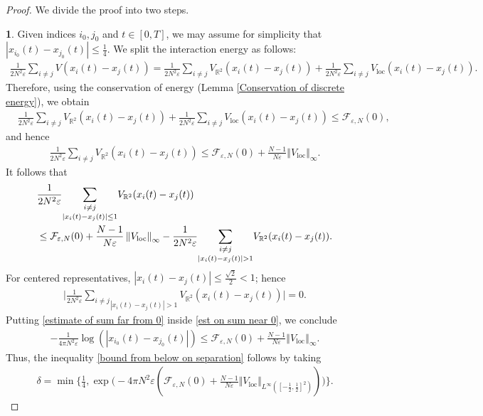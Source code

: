 \documentclass[11pt,reqno]{amsart}
\numberwithin{equation}{section}
\begin{document}
\begin{proof} We divide the proof into two steps.

\smallskip
\textbf{1}. Given indices $i_{0},j_{0}$ and $t\in [0,T]$, 
we may assume for simplicity that $\left\vert x_{i_{0}}(t)-x_{j_{0}}(t)\right\vert \leq \frac{1}{4}$. 
We split the interaction energy as follows:  
\begin{align*}
\frac{1}{2N^{2}\varepsilon}\sum_{i\neq j}V(x_{i}(t)-x_{j}(t))
=\frac{1}{2N^{2}\varepsilon}\sum_{i\neq j}V_{\mathbb{R}^{2}}(x_{i}(t)-x_{j}(t))
+\frac{1}{2N^{2}\varepsilon}\sum_{i\neq j}V_{\mathrm{loc}}(x_{i}(t)-x_{j}(t)).    
\end{align*}
Therefore, using the conservation of energy (Lemma \ref{Conservation of discrete energy}), 
we obtain 
\begin{align*}
&\frac{1}{2N^{2}\varepsilon}\sum_{i\neq j}V_{\mathbb{R}^{2}}(x_{i}(t)-x_{j}(t))+\frac{1}{2N^{2}\varepsilon}\sum_{i\neq j}V_{\mathrm{loc}}(x_{i}(t)-x_{j}(t))
\leq \mathcal{F}_{\varepsilon,N}(0),     
\end{align*}
and hence  
\begin{align*}
\frac{1}{2N^{2}\varepsilon}\sum_{i\neq j} V_{\mathbb{R}^{2}}(x_{i}(t)-x_{j}(t))\leq \mathcal{F}_{\varepsilon,N}(0)+\frac{N-1}{N\varepsilon}\left\Vert V_{\mathrm{loc}}\right\Vert_{\infty}.  
\end{align*}
It follows that 
\begin{align}
&\frac{1}{2N^{2}\varepsilon}\underset{\left\vert x_{i}(t)-x_{j}(t)\right\vert\leq 1}{\sum_{i\neq j}}V_{\mathbb{R}^{2}}(x_{i}(t)-x_{j}(t))\notag\\
&\leq \mathcal{F}_{\varepsilon,N}(0)+\frac{N-1}{N\varepsilon}\left\Vert V_{\mathrm{loc}}\right\Vert_{\infty} 
- \frac{1}{2N^{2}\varepsilon}\underset{\left\vert x_{i}(t)-x_{j}(t)\right\vert>1 }{\sum_{i\neq j}}V_{\mathbb{R}^{2}}(x_{i}(t)-x_{j}(t)). \label{est on sum near 0}   
\end{align}
For centered representatives, $\left\vert x_{i}(t)-x_{j}(t)\right\vert\leq \frac{\sqrt{2}}{2}<1$; hence
\begin{align}
\bigg\vert \frac{1}{2N^{2}\varepsilon}\underset{\left\vert x_{i}(t)-x_{j}(t)\right\vert>1 }{\sum_{i\neq j}}V_{\mathbb{R}^{2}}(x_{i}(t)-x_{j}(t))\bigg\vert =0.\label{estimate of sum far from 0}
\end{align}
Putting \eqref{estimate of sum far from 0} inside \eqref{est on sum near 0}, we conclude 
\begin{align*}
-\frac{1}{4\pi N^{2}\varepsilon}\log(\left\vert x_{i_{0}}(t)-x_{j_{0}}(t)\right\vert)\leq \mathcal{F}_{\varepsilon,N}(0)+\frac{N-1}{N\varepsilon}\left\Vert V_{\mathrm{loc}}\right\Vert_{\infty}.       
\end{align*}
Thus, the inequality \eqref{bound from below on separation} follows by taking 
\begin{align*}
\delta=\min\big\{\frac14,
\exp\big(-4\pi N^{2}\varepsilon(\mathcal{F}_{\varepsilon,N}(0)+\frac{N-1}{N\varepsilon}\Vert V_{\mathrm{loc}}
\Vert_{L^{\infty}([-\frac12,\frac12]^2)})\big)\big\}.
\end{align*}


\end{proof}
\end{document}
